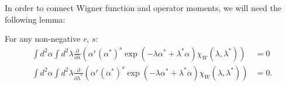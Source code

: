 In order to connect Wigner function and operator moments, we will need the following lemma:
\begin{lemma}
\label{lmm:multimode-formalism:zero-integrals}
For any non-negative $r$, $s$:
\begin{equation*}
\begin{split}
	\int d^2\alpha \int d^2\lambda
		\frac{\partial}{\partial \lambda} \left(
			\alpha^r (\alpha^*)^s \exp(-\lambda \alpha^* + \lambda^* \alpha) \chi_W (\lambda, \lambda^*)
		\right)
	& = 0 \\
	\int d^2\alpha \int d^2\lambda
		\frac{\partial}{\partial \lambda^*} \left(
			\alpha^r (\alpha^*)^s \exp(-\lambda \alpha^* + \lambda^* \alpha) \chi_W (\lambda, \lambda^*)
		\right)
	& = 0.
\end{split}
\end{equation*}
\end{lemma}
